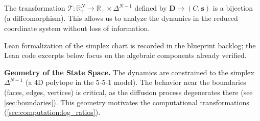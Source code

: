\documentclass[11pt,letterpaper,oneside]{article}
\numberwithin{equation}{section}
\newcommand{\R}{\mathbb{R}}
\newcommand{\1}{\mathbf{1}}
\begin{document}
\begin{tcolorbox}[mathstyle,title={State Space Transformation}]
The transformation $\mathcal{T}: \R_+^N \to \R_+ \times \Delta^{N-1}$ defined by $\bm{D}\mapsto(C,\bm{s})$ is a bijection (a diffeomorphism). This allows us to analyze the dynamics in the reduced coordinate system without loss of information.
\begin{leanproof}[title={Formal Definition: State Space and Simplex}]
Lean formalization of the simplex chart is recorded in the blueprint backlog; the
Lean code excerpts below focus on the algebraic components already verified.
\end{leanproof}

\begin{tcolorbox}[didacticstyle]
    \textbf{Geometry of the State Space.} The dynamics are constrained to the simplex $\Delta^{N-1}$ (a 4D polytope in the 5-5-1 model). The behavior near the boundaries (faces, edges, vertices) is critical, as the diffusion process degenerates there (see \cref{sec:boundaries}). This geometry motivates the computational transformations (\cref{sec:computation:log_ratios}).

\begin{center}
  \label{fig:simplex_geometry}
\end{center}
\end{tcolorbox}
\end{tcolorbox}
\end{document}
